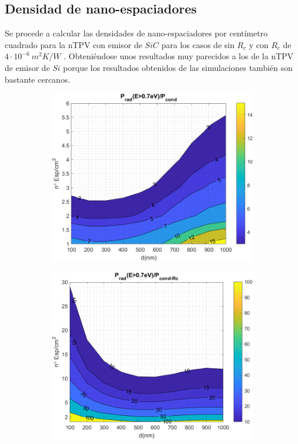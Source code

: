 \subsection{Densidad de nano-espaciadores}
Se procede a calcular las densidades de nano-espaciadores por centímetro cuadrado para la nTPV con emisor de $SiC$ para los casos de sin $R_c$ y con $R_c$ de $4\cdot 10^{-6} \ m^2 K/W$ \cite{nf_TPV_Pillars_SiO2}. Obteniéndose unos resultados muy parecidos a los de la nTPV de emisor de $Si$ porque los resultados obtenidos de las simulaciones también son bastante cercanos.
\graphicspath{ {./figuras/Resultados/RelacionCondRad} }
\begin{figure}[H]
	\centering
	\begin{subfigure}[b]{0.49\textwidth}
		\centering
		\includegraphics[width=1.00\textwidth]{SiC_Ge.png}
		\caption{ }
		\label{fig:rel_SiCSiO2Ge}
	\end{subfigure}
	\hfill
	\begin{subfigure}[b]{0.49\textwidth}
		\centering
		\includegraphics[width=1.00\textwidth]{SiC_Rc.png}

\end{subfigure}
\end{figure}
